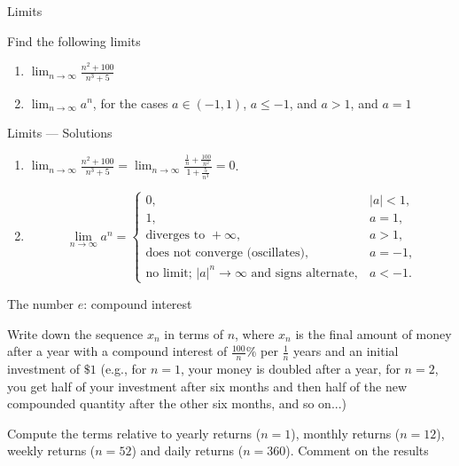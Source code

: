 \documentclass[9pt]{beamer}
\begin{document}
\begin{frame}{Limits}

    Find the following limits

    \begin{enumerate}[leftmargin = 0.5cm, label = (\alph*), rightmargin = 0.2cm]

        \item $\lim_{n\rightarrow\infty} \frac{n^2 + 100}{n^3 + 5}$

        \item $\lim_{n\rightarrow\infty} a^n$, for the cases $a \in (-1, 1)$, $a\leq -1$, and $a > 1$, and $a = 1$

    \end{enumerate}
    
\end{frame}

\begin{frame}{Limits — Solutions}
\begin{enumerate}[leftmargin=0.5cm, label=(\alph*), rightmargin=0.2cm]

  \item $\displaystyle \lim_{n\to\infty}\frac{n^2+100}{n^3+5}
        =\lim_{n\to\infty}\frac{\tfrac{1}{n}+ \tfrac{100}{n^2}}{1+\tfrac{5}{n^3}}
        =0$.

  \item 
  \[
  \;
  \lim_{n\to\infty} a^n 
  =
  \begin{cases}
    0, & |a|<1,\\[2pt]
    1, & a=1,\\[2pt]
    \text{diverges to }+\infty, & a>1,\\[2pt]
    \text{does not converge (oscillates),} & a=-1,\\[2pt]
    \text{no limit; }|a|^n\to\infty\text{ and signs alternate}, & a<-1.
  \end{cases}
  \]

\end{enumerate}
\end{frame}


\begin{frame}{The number $e$: compound interest}

    Write down the sequence $x_n$ in terms of $n$, where $x_n$ is the final amount of money after a year with a compound interest of $\frac{100}{n}\%$ per $\frac{1}{n}$ years and an initial investment of $\$1$ (e.g., for $n = 1$, your money is doubled after a year, for $n = 2$, you get half of your investment after six months and then half of the new compounded quantity after the other six months, and so on...)
    \vspace{0.3cm}
    
    
    Compute the terms relative to yearly returns ($n = 1$), monthly returns ($n = 12$), weekly returns ($n = 52$) and daily returns ($n = 360$). Comment on the results
    
\end{frame}
\end{document}
